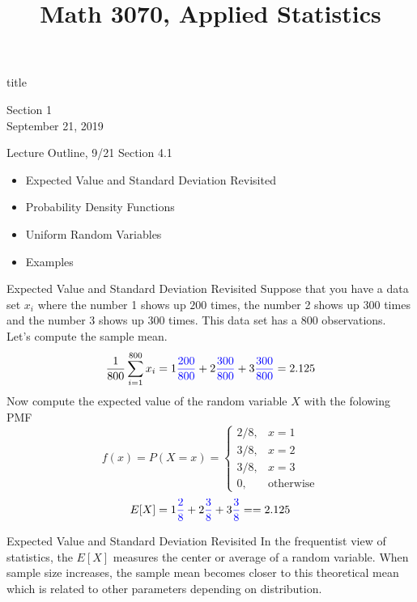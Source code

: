 \documentclass[handout]{beamer}
\title{Math 3070, Applied Statistics}
\newcommand{\blue}[1]{{\color{blue} #1}}
\newcommand{\nl}[1]{\vspace{#1 em}}
\begin{document}
\begin{frame}
    \begin{beamercolorbox}[rounded=true,wd=\textwidth,center]{title}
        \inserttitle
    \end{beamercolorbox}
    \begin{center}
        Section 1\\
        \nl{0.5}
        September 21, 2019
    \end{center}
\end{frame}

\begin{frame}{Lecture Outline, 9/21}
    Section 4.1
    \begin{itemize}
        \item Expected Value and Standard Deviation Revisited
        \item Probability Density Functions
        \item Uniform Random Variables
        \item Examples
    \end{itemize}
\end{frame}

\begin{frame}{Expected Value and Standard Deviation Revisited}
    Suppose that you have a data set $x_i$ where the number 1 shows up $200$ times, the number 2 shows up $300$ times and the number 3 shows up $300$ times. This data set has a $800$ observations.\\ \nl{0.5}
    Let's compute the sample mean.
    $$ \frac{1}{800}\sum_{i=1}^{800} x_i = 1 \blue{\frac{200}{800}} + 2 \blue{\frac{300}{800}} + 3 \blue{\frac{300}{800}}= 2.125$$
    Now compute the expected value of the random variable $X$ with the folowing PMF
    \[
    f(x) = P(X=x) = \left\{\begin{array}{lr}
        2/8, & x=1\\
        3/8, & x=2\\
        3/8, & x=3\\
        0, & \text{otherwise}
        \end{array}\right. \]
        $$ E[X] = 1 \blue{\frac{2}{8}} + 2 \blue{\frac{3}{8}} + 3 \blue{\frac{3}{8}} = = 2.125$$
    \end{frame}

    \begin{frame}{Expected Value and Standard Deviation Revisited}
        In the frequentist view of statistics, the $E[X]$ measures the center or average of a random variable. When sample size increases, the sample mean becomes closer to this theoretical mean which is related to other parameters depending on distribution.
        \end{frame}
\end{document}
